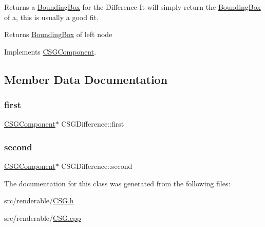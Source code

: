 Returns a \mbox{\hyperlink{classBoundingBox}{Bounding\+Box}} for the Difference It will simply return the \mbox{\hyperlink{classBoundingBox}{Bounding\+Box}} of a, this is usually a good fit. 

\begin{DoxyReturn}{Returns}
\mbox{\hyperlink{classBoundingBox}{Bounding\+Box}} of left node 
\end{DoxyReturn}


Implements \mbox{\hyperlink{classCSGComponent_a4299365f2bab69272af9de4f2bee7cdb}{C\+S\+G\+Component}}.



\subsection{Member Data Documentation}
\mbox{\label{classCSGDifference_a689a622e9b4c43d72575cbbdd2ad847b}} 
\subsubsection{\texorpdfstring{first}{first}}
{\footnotesize\ttfamily \mbox{\hyperlink{classCSGComponent}{C\+S\+G\+Component}}$\ast$ C\+S\+G\+Difference\+::first\hspace{0.3cm}{\ttfamily [private]}}

\mbox{\label{classCSGDifference_ae9b4b0b0839d066ce30006d99536cd99}} 
\subsubsection{\texorpdfstring{second}{second}}
{\footnotesize\ttfamily \mbox{\hyperlink{classCSGComponent}{C\+S\+G\+Component}}$\ast$ C\+S\+G\+Difference\+::second\hspace{0.3cm}{\ttfamily [private]}}



The documentation for this class was generated from the following files\+:\begin{DoxyCompactItemize}
\item 
src/renderable/\mbox{\hyperlink{CSG_8h}{C\+S\+G.\+h}}\item 
src/renderable/\mbox{\hyperlink{CSG_8cpp}{C\+S\+G.\+cpp}}\end{DoxyCompactItemize}

